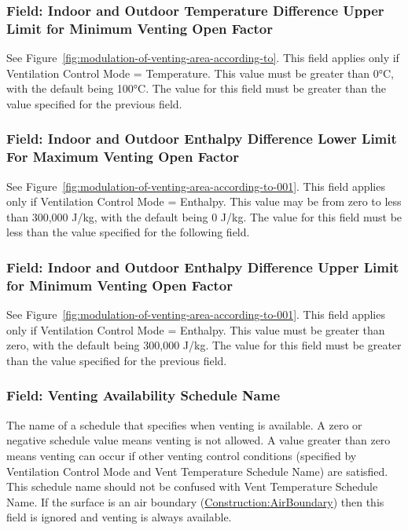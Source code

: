 \subsubsection{Field: Indoor and Outdoor Temperature Difference Upper Limit for Minimum Venting Open Factor}\label{field-indoor-and-outdoor-temperature-difference-upper-limit-for-minimum-venting-open-factor-1}

See Figure~\ref{fig:modulation-of-venting-area-according-to}. This field applies only if Ventilation Control Mode = Temperature. This value must be greater than 0°C, with the default being 100°C. The value for this field must be greater than the value specified for the previous field.

\subsubsection{Field: Indoor and Outdoor Enthalpy Difference Lower Limit For Maximum Venting Open Factor}\label{field-indoor-and-outdoor-enthalpy-difference-lower-limit-for-maximum-venting-open-factor-1}

See Figure~\ref{fig:modulation-of-venting-area-according-to-001}. This field applies only if Ventilation Control Mode = Enthalpy. This value may be from zero to less than 300,000 J/kg, with the default being 0 J/kg. The value for this field must be less than the value specified for the following field.

\subsubsection{Field: Indoor and Outdoor Enthalpy Difference Upper Limit for Minimum Venting Open Factor}\label{field-indoor-and-outdoor-enthalpy-difference-upper-limit-for-minimum-venting-open-factor-1}

See Figure~\ref{fig:modulation-of-venting-area-according-to-001}. This field applies only if Ventilation Control Mode = Enthalpy. This value must be greater than zero, with the default being 300,000 J/kg. The value for this field must be greater than the value specified for the previous field.

\subsubsection{Field: Venting Availability Schedule Name}\label{field-venting-availability-schedule-name-1}

The name of a schedule that specifies when venting is available. A zero or negative schedule value means venting is not allowed. A value greater than zero means venting can occur if other venting control conditions (specified by Ventilation Control Mode and Vent Temperature Schedule Name) are satisfied. This schedule name should not be confused with Vent Temperature Schedule Name.  If the surface is an air boundary (\hyperref[constructionairboundary]{Construction:AirBoundary}) then this field is ignored and venting is always available.

